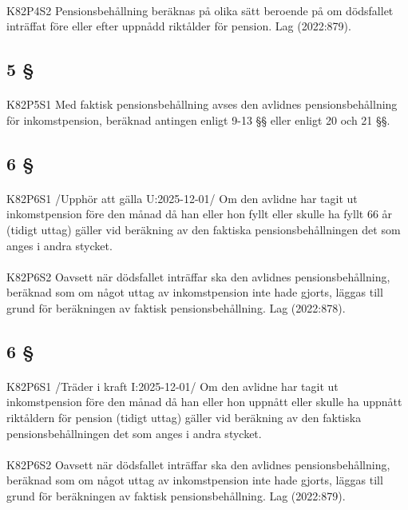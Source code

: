\documentclass[a4paper,notitlepage,openany,10pt]{book}
\begin{document}
\paragraph*{}
{\tiny K82P4S2}
Pensionsbehållning beräknas på olika sätt beroende på om dödsfallet inträffat före eller efter uppnådd riktålder för pension.
Lag (2022:879).
\subsection*{5 §}
\paragraph*{}
{\tiny K82P5S1}
Med faktisk pensionsbehållning avses den avlidnes pensionsbehållning för inkomstpension, beräknad antingen enligt 9-13 §§ eller enligt 20 och 21 §§.
\subsection*{6 §}
\paragraph*{}
{\tiny K82P6S1}
/Upphör att gälla U:2025-12-01/
Om den avlidne har tagit ut inkomstpension före den månad då han eller hon fyllt eller skulle ha fyllt 66 år (tidigt uttag) gäller vid beräkning av den faktiska pensionsbehållningen det som anges i andra stycket.
\paragraph*{}
{\tiny K82P6S2}
Oavsett när dödsfallet inträffar ska den avlidnes pensionsbehållning, beräknad som om något uttag av inkomstpension inte hade gjorts, läggas till grund för beräkningen av faktisk pensionsbehållning.
Lag (2022:878).
\subsection*{6 §}
\paragraph*{}
{\tiny K82P6S1}
/Träder i kraft I:2025-12-01/
Om den avlidne har tagit ut inkomstpension före den månad då han eller hon uppnått eller skulle ha uppnått riktåldern för pension (tidigt uttag) gäller vid beräkning av den faktiska pensionsbehållningen det som anges i andra stycket.
\paragraph*{}
{\tiny K82P6S2}
Oavsett när dödsfallet inträffar ska den avlidnes pensionsbehållning, beräknad som om något uttag av inkomstpension inte hade gjorts, läggas till grund för beräkningen av faktisk pensionsbehållning.
Lag (2022:879).
\end{document}
